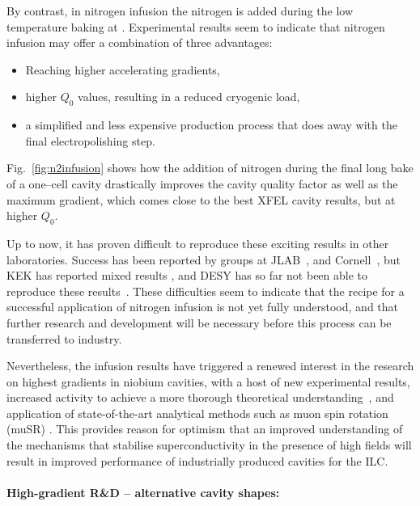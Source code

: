 By contrast, in nitrogen infusion the nitrogen is added during the low temperature baking at .
Experimental results seem to indicate that nitrogen infusion may offer a combination of three advantages:
\begin{itemize}
\item Reaching higher accelerating gradients,
\item higher $Q_0$ values, resulting in a reduced cryogenic load, 
\item a simplified and less expensive production process that does away with the final electropolishing step.
\end{itemize}

Fig.~\ref{fig:n2infusion} \cite[Fig. 5]{Grassellino:2017bod} shows how the addition of nitrogen during the final  long  bake of a one--cell cavity drastically improves the cavity quality factor as well as the maximum gradient, which comes close to the best XFEL cavity results, but at higher $Q_0$.


Up to now, it has proven difficult to reproduce these exciting results in other laboratories.
Success has been reported by groups at JLAB~\cite{Dhakal:2017xxq}, and  Cornell~\cite{Koufalis:2017blg}, but KEK has reported mixed results \cite{bib:Umemori:2018.lcws}, and DESY has so far not been able to reproduce these results~\cite{Wenskat:2018zco}.
These difficulties seem to indicate that the recipe for a successful application of nitrogen infusion is not yet fully understood, and that further research and development will be necessary before this process can be transferred to industry. 

Nevertheless, the infusion results have triggered a renewed interest in the research on highest gradients in niobium cavities, with a host of new experimental results, increased activity to achieve a more thorough theoretical understanding~\cite{Kubo:2017cww,Gurevich:2017vnn}, and application of state-of-the-art analytical methods such as   muon spin rotation (muSR) \cite{Romanenko:2013saa}.
This provides reason for optimism that an improved understanding of the mechanisms that stabilise superconductivity in the presence of high fields will result in improved performance of industrially produced cavities for the ILC.

\paragraph{High-gradient R\&D -- alternative cavity shapes:}

